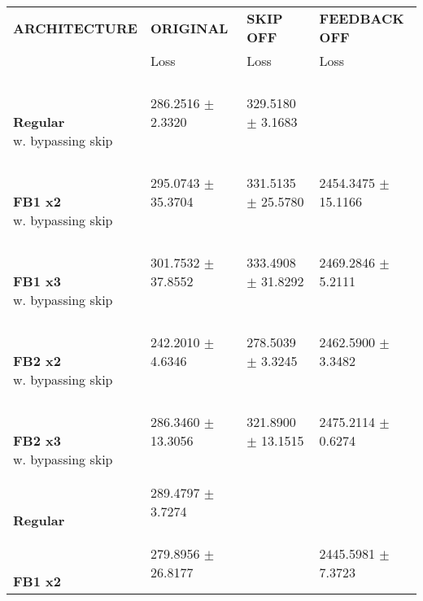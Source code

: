 
\begin{table}[ht]
    \centering
    \begin{tabular}{|>{\columncolor{gray!05}}l|l|l|l|}
        \hline
        \rowcolor{gray!20}
        \textbf{\footnotesize ARCHITECTURE} & \textbf{\footnotesize ORIGINAL} & \textbf{\footnotesize SKIP OFF} & \textbf{\footnotesize FEEDBACK OFF} \\

        \rowcolor{gray!20}
        & {\footnotesize Loss} & {\footnotesize Loss} & {\footnotesize Loss} \\
        \hline
\shortstack[l]{\\ {} \\ \textbf{Regular}\\{w. bypassing skip}} & 286.2516 $\pm$ 2.3320 & 329.5180 $\pm$ 3.1683 &  \\
 \hline 
\shortstack[l]{\\ {} \\ \textbf{FB1 x2}\\{w. bypassing skip}} & 295.0743 $\pm$ 35.3704 & 331.5135 $\pm$ 25.5780 & 2454.3475 $\pm$ 15.1166 \\
 \hline 
\shortstack[l]{\\ {} \\ \textbf{FB1 x3}\\{w. bypassing skip}} & 301.7532 $\pm$ 37.8552 & 333.4908 $\pm$ 31.8292 & 2469.2846 $\pm$ 5.2111 \\
 \hline 
\shortstack[l]{\\ {} \\ \textbf{FB2 x2}\\{w. bypassing skip}} & 242.2010 $\pm$ 4.6346 & 278.5039 $\pm$ 3.3245 & 2462.5900 $\pm$ 3.3482 \\
 \hline 
\shortstack[l]{\\ {} \\ \textbf{FB2 x3}\\{w. bypassing skip}} & 286.3460 $\pm$ 13.3056 & 321.8900 $\pm$ 13.1515 & 2475.2114 $\pm$ 0.6274 \\
 \hline 
\shortstack[l]{\\ {} \\ \textbf{Regular}\\{}} & 289.4797 $\pm$ 3.7274 &  &  \\
 \hline 
\shortstack[l]{\\ {} \\ \textbf{FB1 x2}\\{}} & 279.8956 $\pm$ 26.8177 &  & 2445.5981 $\pm$ 7.3723 \\

\end{tabular}
\end{table}

